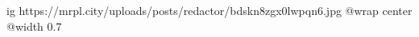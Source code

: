  
 
 
 
 

\ifcmt
  ig https://mrpl.city/uploads/posts/redactor/bdskn8zgx0lwpqn6.jpg
  @wrap center
  @width 0.7
\fi

